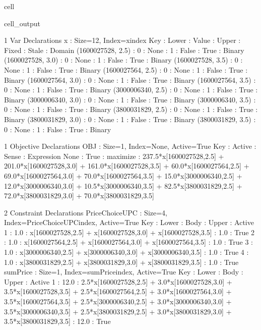 \documentclass[letterpaper,10pt,english]{jupyterBook}
\begin{document}
\begin{sphinxuseclass}{cell}
\begin{sphinxVerbatimOutput}
\begin{sphinxuseclass}{cell_output}
\begin{sphinxVerbatim}[commandchars=\\\{\}]
1 Var Declarations
    x : Size=12, Index=x\PYGZus{}index
        Key               : Lower : Value : Upper : Fixed : Stale : Domain
        (1600027528, 2.5) :     0 :  None :     1 : False :  True : Binary
        (1600027528, 3.0) :     0 :  None :     1 : False :  True : Binary
        (1600027528, 3.5) :     0 :  None :     1 : False :  True : Binary
        (1600027564, 2.5) :     0 :  None :     1 : False :  True : Binary
        (1600027564, 3.0) :     0 :  None :     1 : False :  True : Binary
        (1600027564, 3.5) :     0 :  None :     1 : False :  True : Binary
        (3000006340, 2.5) :     0 :  None :     1 : False :  True : Binary
        (3000006340, 3.0) :     0 :  None :     1 : False :  True : Binary
        (3000006340, 3.5) :     0 :  None :     1 : False :  True : Binary
        (3800031829, 2.5) :     0 :  None :     1 : False :  True : Binary
        (3800031829, 3.0) :     0 :  None :     1 : False :  True : Binary
        (3800031829, 3.5) :     0 :  None :     1 : False :  True : Binary

1 Objective Declarations
    OBJ : Size=1, Index=None, Active=True
        Key  : Active : Sense    : Expression
        None :   True : maximize : 237.5*x[1600027528,2.5] + 201.0*x[1600027528,3.0] + 161.0*x[1600027528,3.5] + 60.0*x[1600027564,2.5] + 69.0*x[1600027564,3.0] + 70.0*x[1600027564,3.5] + 15.0*x[3000006340,2.5] + 12.0*x[3000006340,3.0] + 10.5*x[3000006340,3.5] + 82.5*x[3800031829,2.5] + 72.0*x[3800031829,3.0] + 70.0*x[3800031829,3.5]

2 Constraint Declarations
    PriceChoiceUPC : Size=4, Index=PriceChoiceUPC\PYGZus{}index, Active=True
        Key : Lower : Body                                                      : Upper : Active
          1 :   1.0 : x[1600027528,2.5] + x[1600027528,3.0] + x[1600027528,3.5] :   1.0 :   True
          2 :   1.0 : x[1600027564,2.5] + x[1600027564,3.0] + x[1600027564,3.5] :   1.0 :   True
          3 :   1.0 : x[3000006340,2.5] + x[3000006340,3.0] + x[3000006340,3.5] :   1.0 :   True
          4 :   1.0 : x[3800031829,2.5] + x[3800031829,3.0] + x[3800031829,3.5] :   1.0 :   True
    sumPrice : Size=1, Index=sumPrice\PYGZus{}index, Active=True
        Key : Lower : Body                                                                                                                                                                                                                                                                                          : Upper : Active
          1 :  12.0 : 2.5*x[1600027528,2.5] + 3.0*x[1600027528,3.0] + 3.5*x[1600027528,3.5] + 2.5*x[1600027564,2.5] + 3.0*x[1600027564,3.0] + 3.5*x[1600027564,3.5] + 2.5*x[3000006340,2.5] + 3.0*x[3000006340,3.0] + 3.5*x[3000006340,3.5] + 2.5*x[3800031829,2.5] + 3.0*x[3800031829,3.0] + 3.5*x[3800031829,3.5] :  12.0 :   True


\end{sphinxVerbatim}
\end{sphinxuseclass}
\end{sphinxVerbatimOutput}
\end{sphinxuseclass}
\end{document}
